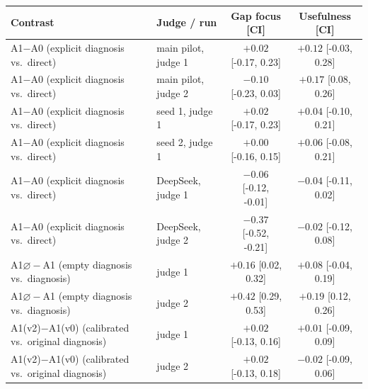 \begin{tabular}{llcc}
\toprule
Contrast & Judge / run & Gap focus [CI] & Usefulness [CI] \\
\midrule
A1$-$A0 (explicit diagnosis vs.\ direct) & main pilot, judge 1 & $+0.02$ [-0.17, 0.23] & $+0.12$ [-0.03, 0.28] \\
A1$-$A0 (explicit diagnosis vs.\ direct) & main pilot, judge 2 & $-0.10$ [-0.23, 0.03] & $+0.17$ [0.08, 0.26] \\
A1$-$A0 (explicit diagnosis vs.\ direct) & seed 1, judge 1 & $+0.02$ [-0.17, 0.23] & $+0.04$ [-0.10, 0.21] \\
A1$-$A0 (explicit diagnosis vs.\ direct) & seed 2, judge 1 & $+0.00$ [-0.16, 0.15] & $+0.06$ [-0.08, 0.21] \\
A1$-$A0 (explicit diagnosis vs.\ direct) & DeepSeek, judge 1 & $-0.06$ [-0.12, -0.01] & $-0.04$ [-0.11, 0.02] \\
A1$-$A0 (explicit diagnosis vs.\ direct) & DeepSeek, judge 2 & $-0.37$ [-0.52, -0.21] & $-0.02$ [-0.12, 0.08] \\
\midrule
A1$\varnothing-$A1 (empty diagnosis vs.\ diagnosis) & judge 1 & $+0.16$ [0.02, 0.32] & $+0.08$ [-0.04, 0.19] \\
A1$\varnothing-$A1 (empty diagnosis vs.\ diagnosis) & judge 2 & $+0.42$ [0.29, 0.53] & $+0.19$ [0.12, 0.26] \\
\midrule
A1(v2)$-$A1(v0) (calibrated vs.\ original diagnosis) & judge 1 & $+0.02$ [-0.13, 0.16] & $+0.01$ [-0.09, 0.09] \\
A1(v2)$-$A1(v0) (calibrated vs.\ original diagnosis) & judge 2 & $+0.02$ [-0.13, 0.18] & $-0.02$ [-0.09, 0.06] \\
\bottomrule
\end{tabular}